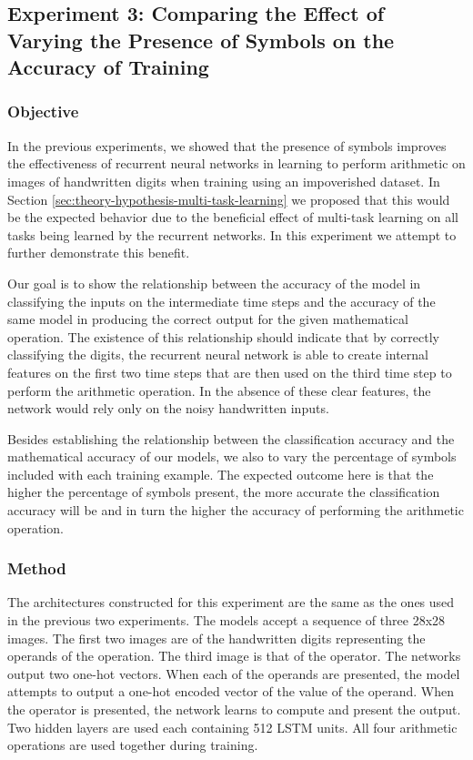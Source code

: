 \subsection{Experiment 3: Comparing the Effect of Varying the Presence of Symbols on the Accuracy of Training} \label{sec:experiment-3}

\subsubsection{Objective}

In the previous experiments, we showed that the presence of symbols improves the effectiveness of recurrent neural networks in learning to perform arithmetic on images of handwritten digits when training using an impoverished dataset. In Section \ref{sec:theory-hypothesis-multi-task-learning} we proposed that this would be the expected behavior due to the beneficial effect of multi-task learning on all tasks being learned by the recurrent networks. In this experiment we attempt to further demonstrate this benefit.
 
Our goal is to show the relationship between the accuracy of the model in classifying the inputs on the intermediate time steps and the accuracy of the same model in producing the correct output for the given mathematical operation. The existence of this relationship should indicate that by correctly classifying the digits, the recurrent neural network is able to create internal features on the first two time steps that are then used on the third time step to perform the arithmetic operation. In the absence of these clear features, the network would rely only on the noisy handwritten inputs.

Besides establishing the relationship between the classification accuracy and the mathematical accuracy of our models, we also to vary the percentage of symbols included with each training example. The expected outcome here is that the higher the percentage of symbols present, the more accurate the classification accuracy will be and in turn the higher the accuracy of performing the arithmetic operation.

\subsubsection{Method}

The architectures constructed for this experiment are the same as the ones used in the previous two experiments. The models accept a sequence of three 28x28 images. The first two images are of the handwritten digits representing the operands of the operation. The third image is that of the operator. The networks output two one-hot vectors. When each of the operands are presented, the model attempts to output a one-hot encoded vector of the value of the operand. When the operator is presented, the network learns to compute and present the output. Two hidden layers are used each containing 512 LSTM units. All four arithmetic operations are used together during training.

